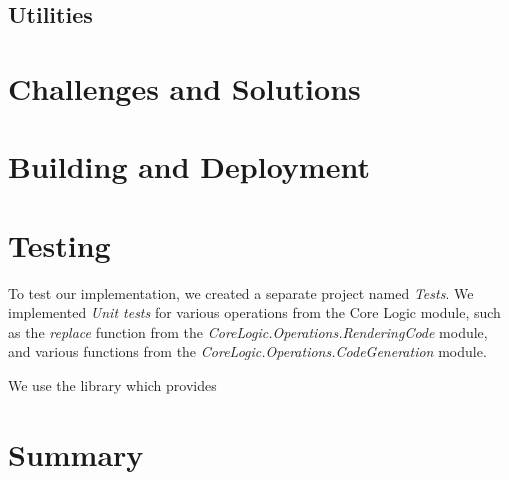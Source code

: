 \subsection{Utilities}


\section{Challenges and Solutions}

\section{Building and Deployment}

\section{Testing}
To test our implementation, we created a separate project named \emph{Tests}.
We implemented \emph{Unit tests} for various operations from the Core Logic module, such as the \emph{replace} function from the \emph{CoreLogic.Operations.RenderingCode} module, and various functions from the \emph{CoreLogic.Operations.CodeGeneration} module.

We use the \citet{mocha} library which provides
\section{Summary}
